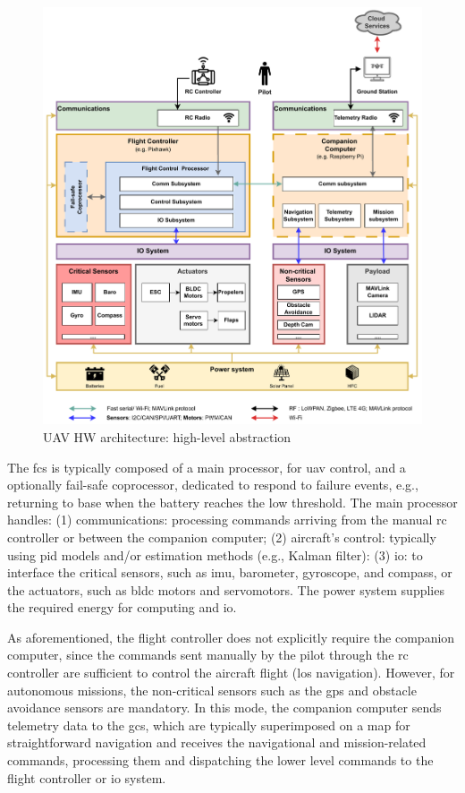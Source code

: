 \begin{figure}[!hbt]
  \centering
  \includegraphics[width=1.0\textwidth]{./img/pdf/uav-hw-arch.pdf} 
  \caption{UAV HW architecture: high-level abstraction}%
  \label{fig:uav-hw-arch}
\end{figure}

The \gls{fcs} is typically composed of a main processor, for \gls{uav} control,
and a optionally fail-safe coprocessor, dedicated to respond to failure events,
e.g., returning to base when the battery reaches the low threshold.
The main processor handles: (1) communications: processing commands arriving
from the manual \gls{rc} controller or between the companion computer; (2)
aircraft's control: typically using \gls{pid} models and/or estimation methods
(e.g., Kalman filter): (3) \gls{io}: to
interface the critical sensors, such as \gls{imu}, barometer, gyroscope, and
compass, or the actuators, such as \gls{bldc} motors and servomotors.
The power system supplies the required energy for computing and \gls{io}.

As aforementioned, the flight controller does not explicitly require the
companion computer, since the commands sent manually by the pilot
through the \gls{rc} controller are sufficient to control the aircraft flight
(\gls{los} navigation). However, for autonomous missions, the non-critical
sensors such as the \gls{gps} and obstacle avoidance sensors are mandatory. In
this mode, the companion computer sends telemetry data to the \gls{gcs}, which
are typically superimposed on a map for straightforward navigation and receives
the navigational and mission-related commands, processing them and dispatching
the lower level commands to the flight controller or \gls{io} system.

